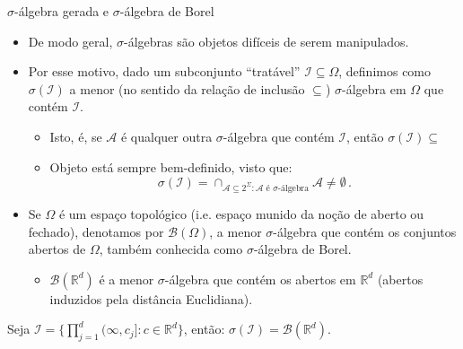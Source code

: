 \documentclass[11pt]{beamer}
\begin{document}
\begin{frame}{$\sigma$-álgebra gerada e $\sigma$-álgebra de Borel}
	\begin{itemize}
		\item De modo geral, $\sigma$-álgebras são objetos difíceis de serem manipulados.
		\item Por esse motivo, dado um subconjunto ``tratável'' $\mathcal{I}\subseteq \Omega$, definimos como $\sigma(\mathcal{I})$ a menor (no sentido da relação de inclusão $\subseteq$) $\sigma$-álgebra em $\Omega$ que contém $\mathcal{I}$.
			\begin{itemize}
				\item Isto, é, se $\mathcal{A}$ é qualquer outra $\sigma$-álgebra que contém $\mathcal{I}$, então $\sigma(\mathcal{I}) \subseteq \mathcal{}$
				\item Objeto está sempre bem-definido, visto que:
				$$\sigma(\mathcal{I}) = \cap_{\mathcal{A}\subseteq 2^\Sigma: \mathcal{A} \text{ é $\sigma$-álgebra} } \mathcal{A} \neq \emptyset\, .$$
			\end{itemize}
			\item Se $\Omega$ é um espaço topológico (i.e. espaço munido da noção de aberto ou fechado), denotamos por $\mathcal{B}(\Omega)$, a menor $\sigma$-álgebra que contém os conjuntos abertos de $\Omega$, também conhecida como $\sigma$-álgebra de Borel.
			\begin{itemize}
				\item $\mathcal{B}(\mathbb{R}^d)$ é a menor $\sigma$-álgebra  que contém os abertos em $\mathbb{R}^d$ (abertos induzidos pela distância Euclidiana).
			\end{itemize}
	\end{itemize}
	\begin{lemma}
		Seja $\mathcal{I} = \{ \prod_{j=1}^d(\infty, c_j] : c \in \mathbb{R}^d\}$, então:
		$\sigma(\mathcal{I}) = \mathcal{B}(\mathbb{R}^d)$.
	\end{lemma}
\end{frame}
\end{document}
